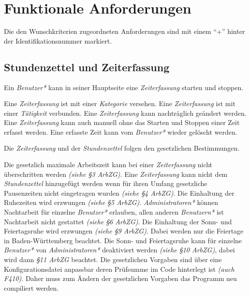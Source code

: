 \section{Funktionale Anforderungen}

Die den Wunschkriterien zugeordneten Anforderungen sind mit einem "`+"' hinter der Identifikationsnummer markiert.

\subsection{Stundenzettel und Zeiterfassung}

\begin{requirements}
    Ein \emph{Benutzer*} kann in seiner Hauptseite eine \emph{Zeiterfassung} starten und stoppen.
    \begin{requirements}
         Eine \emph{Zeiterfassung} ist mit einer \emph{Kategorie} versehen.
         Eine \emph{Zeiterfassung} ist mit einer \emph{Tätigkeit} verbunden.
         Eine \emph{Zeiterfassung} kann nachträglich geändert werden.
         Eine \emph{Zeiterfassung} kann auch manuell ohne das Starten und Stoppen einer Zeit erfasst werden.
         Eine erfasste Zeit kann vom \emph{Benutzer*} wieder gelöscht werden.
    \end{requirements}

    Die \emph{Zeiterfassung} und der \emph{Stundenzettel} folgen den gesetzlichen Bestimmungen.
    \begin{requirements}
         Die gesetzlich maximale Arbeitszeit kann bei einer \emph{Zeiterfassung} nicht überschritten werden \emph{(siehe §3 ArbZG)}.
         Eine \emph{Zeiterfassung} kann nicht dem \emph{Stundenzettel} hinzugefügt werden wenn für ihren Umfang gesetzliche Pausenzeiten nicht eingetragen wurden \emph{(siehe §4 ArbZG)}.
         Die Einhaltung der Ruhezeiten wird erzwungen \emph{(siehe §5 ArbZG)}.
         \emph{Administratoren*} können Nachtarbeit für einzelne \emph{Benutzer*} erlauben, allen anderen \emph{Benutzern*} ist Nachtarbeit nicht gestattet \emph{(siehe §6 ArbZG)}.
         Die Einhaltung der Sonn- und Feiertagsruhe wird erzwungen \emph{(siehe §9 ArbZG)}.
                Dabei werden nur die Feiertage in Baden-Württemberg beachtet.
                Die Sonn- und Feiertagsruhe kann für einzelne \emph{Benutzer*} von \emph{Administratoren*} deaktiviert werden \emph{(siehe §10 ArbZG)}, dabei wird dann \emph{§11 ArbZG} beachtet.
         Die gesetzlichen Vorgaben sind über eine Konfigurationsdatei anpassbar deren Prüfsumme im Code hinterlegt ist \emph{(auch F410)}.
                Daher muss zum Ändern der gesetzlichen Vorgaben das Programm neu compiliert werden.
    \end{requirements}


\end{requirements}
